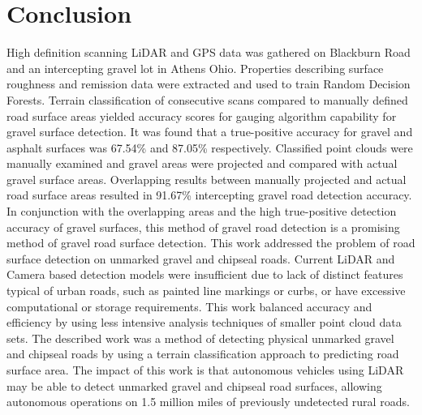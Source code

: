 \documentclass[journal,onecolumn]{IEEEtran}
\begin{document}
	
	
	
\section{Conclusion}
	
	{High definition scanning LiDAR and GPS data was gathered on Blackburn Road and an intercepting gravel lot in Athens Ohio. Properties describing surface roughness and remission data were extracted and used to train Random Decision Forests. Terrain classification of consecutive scans compared to manually defined road surface areas yielded accuracy scores for gauging algorithm capability for gravel surface detection. It was found that a true-positive accuracy for gravel and asphalt surfaces was 67.54\% and 87.05\% respectively. Classified point clouds were manually examined and gravel areas were projected and compared with actual gravel surface areas. Overlapping results between manually projected and actual road surface areas resulted in 91.67\% intercepting gravel road detection accuracy. In conjunction with the overlapping areas and the high true-positive detection accuracy of gravel surfaces, this method of gravel road detection is a promising method of gravel road surface detection. This work addressed the problem of road surface detection on unmarked gravel and chipseal roads. Current LiDAR and Camera based detection models were insufficient due to lack of distinct features typical of urban roads, such as painted line markings or curbs, or have excessive computational or storage requirements. This work balanced accuracy and efficiency by using less intensive analysis techniques of smaller point cloud data sets. The described work was a method of detecting physical unmarked gravel and chipseal roads by using a terrain classification approach to predicting road surface area. The impact of this work is that autonomous vehicles using LiDAR may be able to detect unmarked gravel and chipseal road surfaces, allowing autonomous operations on 1.5 million miles of previously undetected rural roads.} 
	
	
%
\IEEEpeerreviewmaketitle
\end{document}

